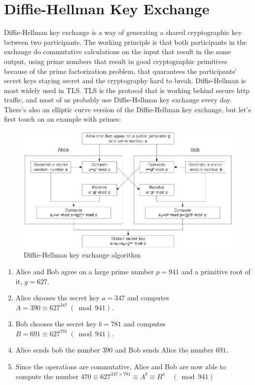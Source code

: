 \section{Diffie-Hellman Key Exchange}

Diffie-Hellman key exchange is a way of generating a shared cryptographic key between two participants. The working principle is that both participants in the exchange do commutative calculations on the input that result in the same output, using prime numbers that result in good cryptographic primitives because of the prime factorization problem, that quarantees the participants' secret keys staying secret and the cryptography hard to break. Diffie-Hellman is most widely used in TLS. TLS is the protocol that is working behind secure http traffic, and most of us probably use Diffie-Hellman key exchange every day. There's also an elliptic curve version of the Diffie-Hellman key exchange, but let's first touch on an example with primes:

\begin{figure}
	\includegraphics[width=\textwidth]{pictures/diffiehellman.eps}
	\caption{Diffie-Hellman key exchange algorithm\cite{Jeon2014-ag}}
	\label{Diagram, Diffie-Hellman Key Exchange}
\end{figure}

\begin{enumerate}
  \item Alice and Bob agree on a large prime number $p = 941$ and a primitive root of it, $g = 627$.
  \item Alice chooses the secret key $a = 347$ and computes
    \(A = 390 \equiv 627^{347} \ (\bmod 941).\)
  \item Bob chooses the secret key $b = 781$ and computes
    \(B = 691 \equiv 627^{781} \ (\bmod 941).\)
  \item Alice sends bob the number $390$ and Bob sends Alice the number $691$.
  \item Since the operations are commutative, Alice and Bob are now able to compute the number
    \(470 \equiv 627^{347 \times 781} \equiv A^b \equiv B^a \quad (\bmod 941)\)
\end{enumerate}

